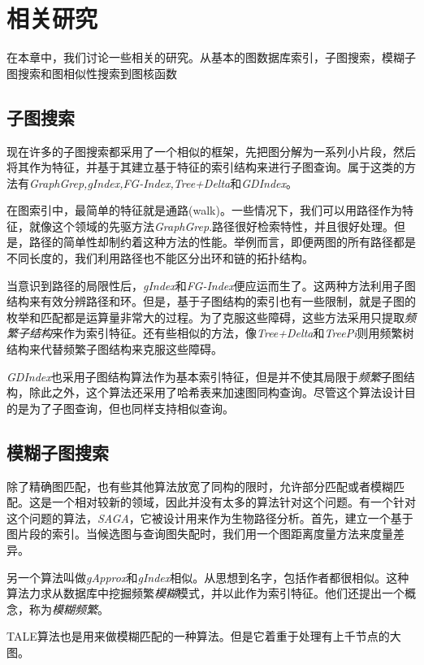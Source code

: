 \documentclass{article}
\begin{document}
\else

\fi
\section{相关研究}
在本章中，我们讨论一些相关的研究。从基本的图数据库索引，子图搜索，模糊子图搜索和图相似性搜索到图核函数
\subsection{子图搜索}
现在许多的子图搜索都采用了一个相似的框架，先把图分解为一系列小片段，然后将其作为特征，并基于其建立基于特征的索引结构来进行子图查询。属于这类的方法有\emph{GraphGrep,gIndex,FG-Index,Tree+Delta}和\emph{GDIndex}。

在图索引中，最简单的特征就是通路(walk)。一些情况下，我们可以用路径作为特征，就像这个领域的先驱方法\emph{GraphGrep}.路径很好检索特性，并且很好处理。但是，路径的简单性却制约着这种方法的性能。举例而言，即便两图的所有路径都是不同长度的，我们利用路径也不能区分出环和链的拓扑结构。

当意识到路径的局限性后，\emph{gIndex}和\emph{FG-Index}便应运而生了。这两种方法利用子图结构来有效分辨路径和环。但是，基于子图结构的索引也有一些限制，就是子图的枚举和匹配都是运算量非常大的过程。为了克服这些障碍，这些方法采用只提取\emph{频繁子结构}来作为索引特征。还有些相似的方法，像\emph{Tree+Delta}和\emph{TreePi}则用频繁树结构来代替频繁子图结构来克服这些障碍。

\emph{GDIndex}也采用子图结构算法作为基本索引特征，但是并不使其局限于\emph{频繁}子图结构，除此之外，这个算法还采用了哈希表来加速图同构查询。尽管这个算法设计目的是为了子图查询，但也同样支持相似查询。

\subsection{模糊子图搜索}
除了精确图匹配，也有些其他算法放宽了同构的限时，允许部分匹配或者模糊匹配。这是一个相对较新的领域，因此并没有太多的算法针对这个问题。有一个针对这个问题的算法，\emph{SAGA}，它被设计用来作为生物路径分析。首先，建立一个基于图片段的索引。当候选图与查询图失配时，我们用一个图距离度量方法来度量差异。

另一个算法叫做\emph{gApprox}和\emph{gIndex}相似。从思想到名字，包括作者都很相似。这种算法力求从数据库中挖掘频繁\emph{模糊}模式，并以此作为索引特征。他们还提出一个概念，称为\emph{模糊频繁}。

TALE算法也是用来做模糊匹配的一种算法。但是它着重于处理有上千节点的大图。
\end{document}
